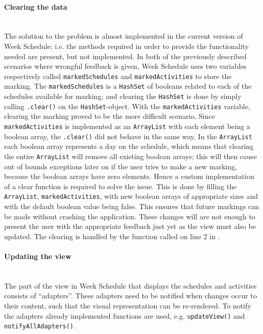 \paragraph{Clearing the data}\hfill\\
The solution to the problem is almost implemented in the current version of Week Schedule; i.e. the methods required in order to provide the functionality needed are present, but not implemented.
In both of the previously described scenarios where wrongful feedback is given, Week Schedule uses two variables respectively called \texttt{markedSchedules} and \texttt{markedActivities} to store the marking.
The \texttt{markedSchedules} is a \texttt{HashSet} of booleans related to each of the schedules available for marking; and clearing the \texttt{HashSet} is done by simply calling \texttt{.clear()} on the \texttt{HashSet}-object.
With the \texttt{markedActivities} variable, clearing the marking proved to be the more difficult scenario.
Since \texttt{markedActivities} is implemented as an \texttt{ArrayList} with each element being a boolean array, the \texttt{.clear()} did not behave in the same way.
In the \texttt{ArrayList} each boolean array represents a day on the schedule, which means that clearing the entire \texttt{ArrayList} will remove all existing boolean arrays; this will then cause out of bounds exceptions later on if the user tries to make a new marking, because the boolean arrays have zero elements. 
Hence a custom implementation of a clear function is required to solve the issue.
This is done by filling the \texttt{ArrayList}, \texttt{markedActivities}, with new boolean arrays of appropriate sizes and with the default boolean value being false.
This ensures that future markings can be made without crashing the application.
These changes will are not enough to present the user with the appropriate feedback just yet as the view must also be updated.
The clearing is handled by the function called on line 2 in .

\paragraph{Updating the view}\hfill\\
The part of the view in Week Schedule that displays the schedules and activities consists of \enquote{adapters}.
These adapters need to be notified when changes occur to their content, such that the visual representation can be re-rendered.
To notify the adapters already implemented functions are used, e.g. \texttt{updateView()} and \texttt{notifyAllAdapters()}.

